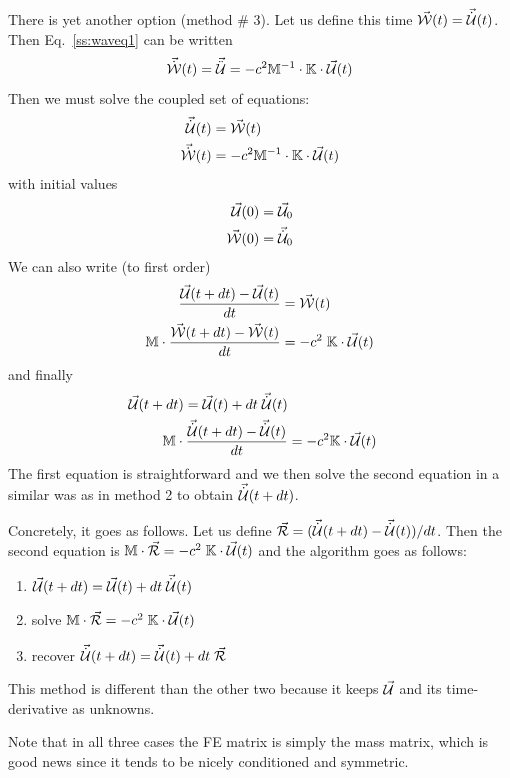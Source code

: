 There is yet another option (method \# 3). 
Let us define this time $\vec{\cal W}(t)=\vec{\dot{{\cal U}}}(t)$.
Then Eq.~\eqref{ss:waveq1} can be written 
\[
\vec{\dot{{\cal W}}}(t) = \vec{\ddot{{\cal U}}} = -c^2 {\mathbb{M}}^{-1} 
\cdot {\mathbb{K}} \cdot \vec{\cal U}(t)
\]
Then we must solve the coupled set of equations:
\begin{align}
\vec{\dot{{\cal U}}}(t) &= \vec{\cal W}(t) \\
\vec{\dot{{\cal W}}}(t) &= -c^2 {\mathbb{M}}^{-1} \cdot {\mathbb{K}} \cdot \vec{\cal U}(t) 
\end{align}
with initial values
\begin{align}
\vec{\cal U}(0) &= \vec{\cal U}_0 \\ 
\vec{\cal W}(0) &= \vec{\dot{{\cal U}}}_0
\end{align}
We can also write (to first order)
\begin{align}
\frac{\vec{\cal U}(t+dt)-\vec{\cal U}(t) }{dt}    &= \vec{\cal W}(t) \\
{\mathbb{M}} \cdot \frac{\vec{\cal W}(t+dt)-\vec{\cal W}(t) }{dt}  &= -c^2 \; {\mathbb{K}} \cdot \vec{\cal U}(t) 
\end{align}
and finally
\begin{align}
\vec{\cal U}(t+dt) = \vec{\cal U}(t) + dt \; \vec{\dot{{\cal U}}}(t) \\
{\mathbb{M}} \cdot \frac{\vec{\dot{{\cal U}}}(t+dt)-\vec{\dot{{\cal U}}}(t) }{dt}  &= -c^2 {\mathbb{K}} \cdot \vec{\cal U}(t) 
\end{align}
The first equation is straightforward and we then solve the second equation in a similar 
was as in method 2 to obtain $\vec{\dot{{\cal U}}}(t+dt)$.

Concretely, it goes as follows. Let us define 
$\vec{\cal R}= (\vec{\dot{{\cal U}}}(t+dt)-\vec{\dot{{\cal U}}}(t) )/dt$.
Then the second equation is ${\mathbb{M}} \cdot \vec{\cal R} = -c^2 \; {\mathbb{K}} \cdot \vec{\cal U}(t)$ 
and the algorithm goes 
as follows:
\begin{enumerate}
\item $\vec{\cal U}(t+dt) = \vec{\cal U}(t) + dt \; \vec{\dot{{\cal U}}}(t)$
\item solve ${\mathbb{M}} \cdot \vec{\cal R} = -c^2 \; {\mathbb{K}} \cdot \vec{\cal U}(t)$ 
\item recover $\vec{\dot{{\cal U}}}(t+dt) = \vec{\dot{{\cal U}}}(t) + dt \; \vec{\cal R}$
\end{enumerate}
This method is different than the other two because it keeps $\vec{\cal U}$ 
and its time-derivative as unknowns. 

Note that in all three cases the FE matrix is simply the mass matrix, 
which is good news since it tends to be nicely conditioned and symmetric.

